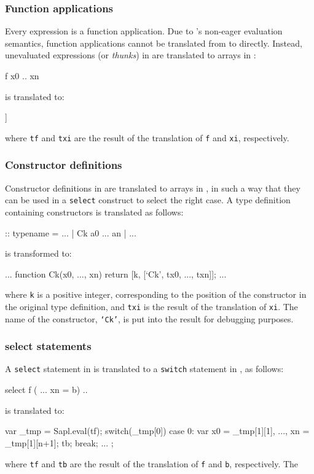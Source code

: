 \subsubsection{Function applications} 
Every \Sapl expression is a function application. Due to \JS's non-eager 
evaluation semantics, function applications cannot be translated from \Sapl to 
\JS directly. Instead, unevaluated expressions (or \emph{thunks}) in \Sapl are translated to arrays in \JS:
\begin{CleanCode}
f x0 .. xn 
\end{CleanCode}
is translated to:
\begin{CleanCode}
[tf, [tx0, ..., txn]]
\end{CleanCode}
where \texttt{tf} and \texttt{txi} are the result of the translation of 
\texttt{f} and \texttt{xi}, respectively.

\subsubsection{Constructor definitions} 
Constructor definitions in \Sapl are translated to arrays in \JS, in such a way 
that they can be used in a \texttt{select} construct to select the right case. 
A \Sapl type definition containing constructors is translated as follows:
\begin{CleanCode}
:: typename = ... | Ck a0 ... an | ...
\end{CleanCode}
is transformed to:
\begin{CleanCode}
... function Ck(x0, ..., xn) { return [k, [`Ck', tx0, ..., txn]]; } ...
\end{CleanCode}
where \texttt{k} is a positive integer, corresponding to the position of the 
constructor in the original type definition, and \texttt{txi} is the result of
the translation of \texttt{xi}. The name of the constructor, \texttt{`Ck'}, is 
put into the result for debugging purposes.

\subsubsection{\textsf{select} statements} 
A \texttt{select} statement in \Sapl is translated to a \texttt{switch} 
statement in \JS, as follows:
\begin{CleanCode}
select f ( ... xn = b) ..
\end{CleanCode}
is translated to:
\begin{CleanCode}
var _tmp = Sapl.eval(tf);
switch(_tmp[0]) {
	case 0: var x0 = _tmp[1][1], ..., xn = _tmp[1][n+1];
	        tb;
            break;
	...
};
\end{CleanCode}
where \texttt{tf} and \texttt{tb} are the result of the translation of
\texttt{f} and \texttt{b}, respectively. The

